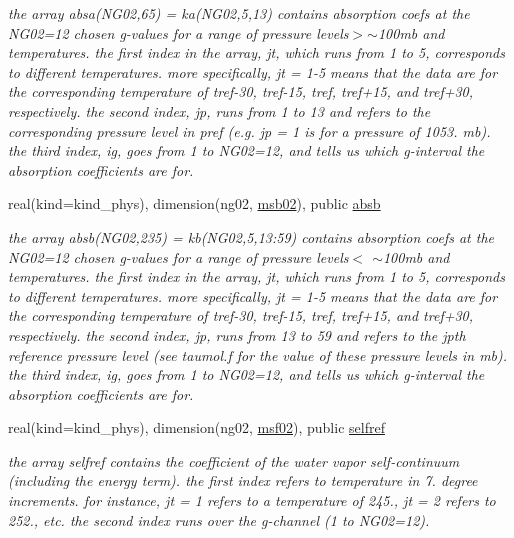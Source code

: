 \begin{DoxyCompactItemize}
\begin{DoxyCompactList}\small\item\em the array absa(\+N\+G02,65) = ka(\+N\+G02,5,13) contains absorption coefs at the N\+G02=12 chosen g-\/values for a range of pressure levels$>$$\sim$100mb and temperatures. the first index in the array, jt, which runs from 1 to 5, corresponds to different temperatures. more specifically, jt = 1-\/5 means that the data are for the corresponding temperature of tref-\/30, tref-\/15, tref, tref+15, and tref+30, respectively. the second index, jp, runs from 1 to 13 and refers to the corresponding pressure level in pref (e.\+g. jp = 1 is for a pressure of 1053. mb). the third index, ig, goes from 1 to N\+G02=12, and tells us which g-\/interval the absorption coefficients are for. \end{DoxyCompactList}\item 
real(kind=kind\+\_\+phys), dimension(ng02, \hyperlink{group__module__radlw__kgbnn_ga03e70b84fd16795104a3fb7b425af70c}{msb02}), public \hyperlink{group__module__radlw__kgbnn_gacf34f9255586c9ed5ac5370db5b63c14}{absb}
\begin{DoxyCompactList}\small\item\em the array absb(\+N\+G02,235) = kb(\+N\+G02,5,13\+:59) contains absorption coefs at the N\+G02=12 chosen g-\/values for a range of pressure levels$<$ $\sim$100mb and temperatures. the first index in the array, jt, which runs from 1 to 5, corresponds to different temperatures. more specifically, jt = 1-\/5 means that the data are for the corresponding temperature of tref-\/30, tref-\/15, tref, tref+15, and tref+30, respectively. the second index, jp, runs from 13 to 59 and refers to the jpth reference pressure level (see taumol.\+f for the value of these pressure levels in mb). the third index, ig, goes from 1 to N\+G02=12, and tells us which g-\/interval the absorption coefficients are for. \end{DoxyCompactList}\item 
real(kind=kind\+\_\+phys), dimension(ng02, \hyperlink{group__module__radlw__kgbnn_ga99b728d38d664afc203303563541ab5c}{msf02}), public \hyperlink{group__module__radlw__kgbnn_gaddb071e93b4ff49ba1f1c4d102e275f1}{selfref}
\begin{DoxyCompactList}\small\item\em the array selfref contains the coefficient of the water vapor self-\/continuum (including the energy term). the first index refers to temperature in 7. degree increments. for instance, jt = 1 refers to a temperature of 245., jt = 2 refers to 252., etc. the second index runs over the g-\/channel (1 to N\+G02=12). \end{DoxyCompactList}\item 

\end{DoxyCompactItemize}
